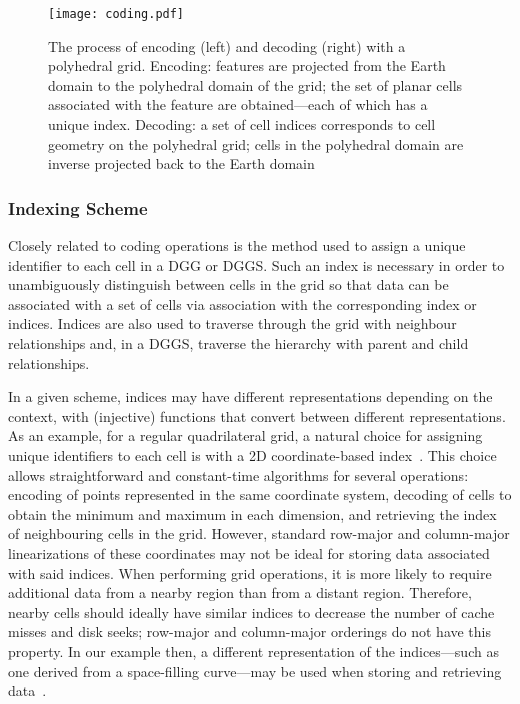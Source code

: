 \begin{figure}[ht!]
	\centering
	\texttt{[image: coding.pdf]}
	\caption[Grid encoding and decoding with a polyhedral grid]{
		The process of encoding (left) and decoding (right) with a polyhedral grid.
		Encoding: features are projected from the Earth domain to the polyhedral domain of the grid; the set of planar cells associated with the feature are obtained---each of which has a unique index.
		Decoding: a set of cell indices corresponds to cell geometry on the polyhedral grid; cells in the polyhedral domain are inverse projected back to the Earth domain
	}
	\label{fig:coding}
\end{figure}


\subsubsection{Indexing Scheme} \label{chap:2:indexing}
Closely related to coding operations is the method used to assign a unique identifier to each cell in a DGG or DGGS.
Such an index is necessary in order to unambiguously distinguish between cells in the grid so that data can be associated with a set of cells via association with the corresponding index or indices.
Indices are also used to traverse through the grid with neighbour relationships and, in a DGGS, traverse the hierarchy with parent and child relationships.


In a given scheme, indices may have different representations depending on the context, with (injective) functions that convert between different representations.
As an example, for a regular quadrilateral grid, a natural choice for assigning unique identifiers to each cell is with a 2D coordinate-based index~\cite{mahdavi2015survey}.
This choice allows straightforward and constant-time algorithms for several operations: encoding of points represented in the same coordinate system, decoding of cells to obtain the minimum and maximum in each dimension, and retrieving the index of neighbouring cells in the grid.
However, standard row-major and column-major linearizations of these coordinates may not be ideal for storing data associated with said indices.
When performing grid operations, it is more likely to require additional data from a nearby region than from a distant region.
Therefore, nearby cells should ideally have similar indices to decrease the number of cache misses and disk seeks; row-major and column-major orderings do not have this property.
In our example then, a different representation of the indices---such as one derived from a space-filling curve---may be used when storing and retrieving data~\cite{morton1966computer}.


